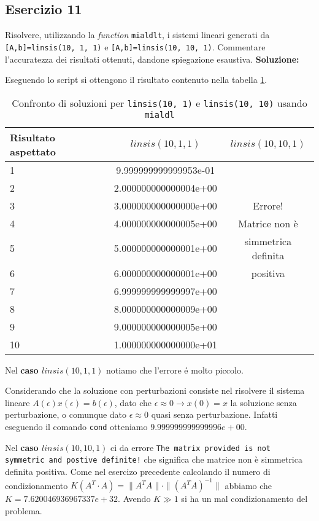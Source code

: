 \subsection{Esercizio 11}
Risolvere, utilizzando la \textit{function} \lstinline{mialdlt}, i sistemi
lineari generati da \lstinline{[A,b]=linsis(10, 1, 1)} e \lstinline{[A,b]=linsis(10, 10, 1)}.
Commentare l'accuratezza dei risultati ottenuti, dandone spiegazione esaustiva.
\newline \textbf{Soluzione:}

Eseguendo lo script  si ottengono il risultato contenuto nella
tabella \ref{tab:11}.

\begin{table}[ht]
  \centering
  \renewcommand\arraystretch{2}
  \begin{tabular}{|l | c c |}
    \hline
    Risultato aspettato & $linsis(10, 1, 1)$    & $linsis(10, 10, 1)$ \\
    \hline
    1                   & 9.999999999999953e-01 &                     \\
    2                   & 2.000000000000004e+00 &                     \\
    3                   & 3.000000000000000e+00 & Errore!             \\
    4                   & 4.000000000000005e+00 & Matrice non è       \\
    5                   & 5.000000000000001e+00 & simmetrica definita \\
    6                   & 6.000000000000001e+00 & positiva            \\
    7                   & 6.999999999999997e+00 &                     \\
    8                   & 8.000000000000009e+00 &                     \\
    9                   & 9.000000000000005e+00 &                     \\
    10                  & 1.000000000000000e+01 &                     \\
    \hline
  \end{tabular}
  \caption{Confronto di soluzioni per \lstinline{linsis(10, 1)} e \lstinline{linsis(10, 10)} usando \lstinline{mialdl}}
  \label{tab:11}
\end{table}
\FloatBarrier
Nel \textbf{caso $linsis(10, 1, 1)$} notiamo che l'errore é molto piccolo.

Considerando che la soluzione con perturbazioni consiste nel risolvere il sistema
lineare $A(\epsilon)x(\epsilon) = b(\epsilon)$, dato che $\epsilon \approx 0 \rightarrow x(0) = x$
la soluzione senza perturbazione, o comunque dato $\epsilon \approx 0$ quasi senza perturbazione.
Infatti eseguendo il comando \lstinline{cond} otteniamo $9.999999999999996e+00$.

Nel \textbf{caso $linsis(10, 10, 1)$} ci da errore \lstinline{The matrix provided is not symmetric and postive definite!}
che significa che matrice non è simmetrica definita positiva.
Come nel esercizo precedente calcolando il numero di condizionamento
$K(A^T\cdot A) = \|A^T A\|\cdot\|(A^T A)^{-1}\|$ abbiamo che $K = 7.620046936967337e+32 $.
Avendo $K \gg 1$ si ha un mal condizionamento del problema.
